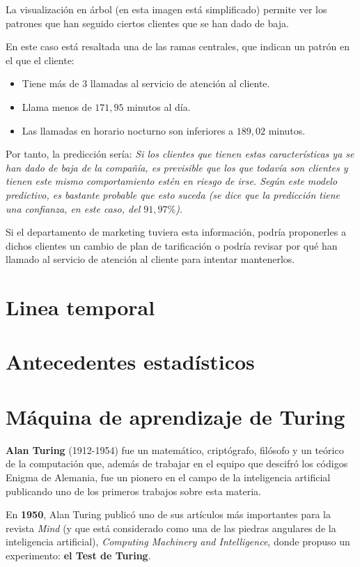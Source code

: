 \documentclass[a4paper, 11pt]{article} %
\begin{document}
\begin{shaded}
La visualización en árbol (en esta imagen está simplificado) permite ver los patrones que han seguido ciertos clientes que se han dado de baja.

En este caso está resaltada una de las ramas centrales, que indican un patrón en el que el cliente:
\begin{itemize}
    \item Tiene más de $3$ llamadas al servicio de atención al cliente.
    \item Llama menos de $171,95$ minutos al día.
    \item Las llamadas en horario nocturno son inferiores a $189,02$ minutos.
\end{itemize}

Por tanto, la predicción sería: \textit{Si los clientes que tienen estas características ya se han dado de baja de la compañía, es previsible que los que todavía son clientes y tienen este mismo comportamiento estén en riesgo de irse. Según este modelo predictivo, es bastante probable que esto suceda (se dice que la predicción tiene una confianza, en este caso, del $91,97\%$).}

Si el departamento de marketing tuviera esta información, podría proponerles a dichos clientes un cambio de plan de tarificación o podría revisar por qué han llamado al servicio de atención al cliente para intentar mantenerlos.
\end{shaded}
\section{Linea temporal}

\newpage

\section{Antecedentes estadísticos}
\section{Máquina de aprendizaje de Turing}
\textbf{Alan Turing} (1912-1954) fue un matemático, criptógrafo, filósofo y un teórico de la computación que, además de trabajar en el equipo que descifró los códigos Enigma de Alemania, fue un pionero en el campo de la inteligencia artificial publicando uno de los primeros trabajos sobre esta materia.

En \textbf{1950}, Alan Turing publicó uno de sus artículos más importantes para la revista \textit{Mind} (y que está considerado como una de las piedras angulares de la inteligencia artificial), \textit{Computing Machinery and Intelligence}, donde propuso un experimento: \textbf{el Test de Turing}.
\end{document}
